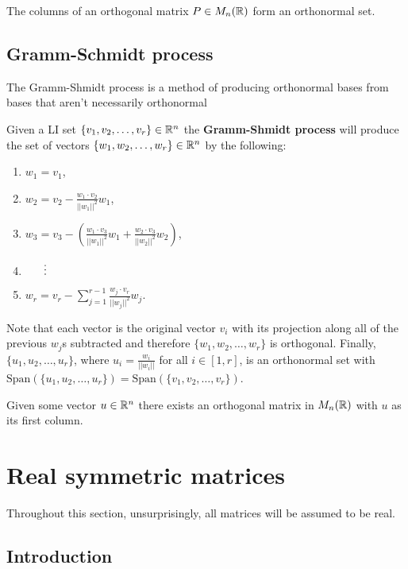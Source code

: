 \begin{theorem}
    The columns of an orthogonal matrix $P\in M_n(\mathbb{R})$ form an orthonormal set.
\end{theorem}

\subsection{Gramm-Schmidt process}
The Gramm-Shmidt process is a method of producing orthonormal bases from bases that aren't necessarily orthonormal
\begin{algorithm}
    Given a LI set $\{v_1,v_2,\ldots,v_r\} \in \mathbb{R}^n$ the \textbf{Gramm-Shmidt process} will produce the set of vectors $\{w_1,w_2,\ldots,w_r\} \in \mathbb{R}^n$ by the following:
    \begin{enumerate}
        \item[] $\displaystyle w_1 = v_1$,
        \item[] $\displaystyle w_2 = v_2 - \frac{w_1\cdot v_2}{||w_1||^2}w_1$,
        \item[] $\displaystyle w_3 = v_3 - \left(\frac{w_1\cdot v_3}{||w_1||^2}w_1 + \frac{w_2\cdot v_3}{||w_2||^2}w_2\right)$,
        \item[] $\hspace{16.5pt}\vdots$
        \item[] $\displaystyle w_r = v_r - \sum_{j=1}^{r-1}\frac{w_j\cdot v_r}{||w_j||^2}w_j$.
    \end{enumerate}
    Note that each vector is the original vector $v_i$ with its projection along all of the previous $w_j$s subtracted and therefore $\{w_1,w_2,\ldots,w_r\}$ is orthogonal. Finally, $\{u_1,u_2,\ldots,u_r\}$, where $\displaystyle u_i = \frac{w_i}{||w_i||}$ for all $i\in[1,r]$, is an orthonormal set with $\text{Span}(\{u_1,u_2,\ldots,u_r\}) = \text{Span}(\{v_1,v_2,\ldots,v_r\})$.
\end{algorithm}

\begin{corollary}
    Given some vector $u\in\mathbb{R}^n$ there exists an orthogonal matrix in $M_n(\mathbb{R})$ with $u$ as its first column.
\end{corollary}

\section{Real symmetric matrices}
Throughout this section, unsurprisingly, all matrices will be assumed to be real.
\subsection{Introduction}

